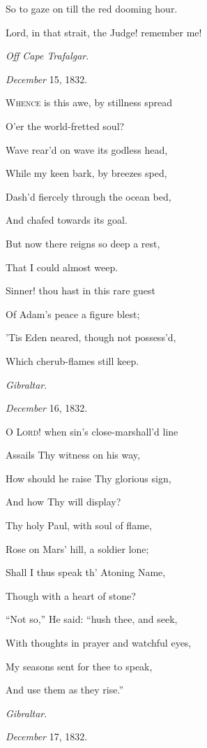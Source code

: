 So to gaze on till the red dooming hour.

Lord, in that strait, the Judge! remember me!

\emph{Off Cape Trafalgar}.

\emph{December} 15, 1832.


W\textsc{hence} is this awe, by stillness spread

O'er the
world-fretted soul?

Wave rear'd on wave its godless head,

While my keen bark, by breezes sped,

Dash'd fiercely through the ocean bed,

And chafed towards
its goal.

But now there reigns so deep a rest,

That I could almost
weep.

Sinner! thou hast in this rare guest

Of Adam's peace a figure blest;

'Tis Eden neared, though not possess'd,

Which cherub-flames
still keep.

\emph{Gibraltar}.

\emph{December} 16, 1832.


O L\textsc{ord}! when sin's close-marshall'd line

Assails Thy witness on his way,

How should he raise Thy glorious sign,

And how Thy will display?

Thy holy Paul, with soul of flame,

Rose on Mars' hill, a soldier lone;

Shall I thus speak th' Atoning Name,

Though with a heart of stone?

``Not so,'' He said: ``hush thee, and seek,

With thoughts in prayer and watchful eyes,

My seasons sent for thee to speak,

And use them as they rise.''

\emph{Gibraltar}.

\emph{December} 17, 1832.


